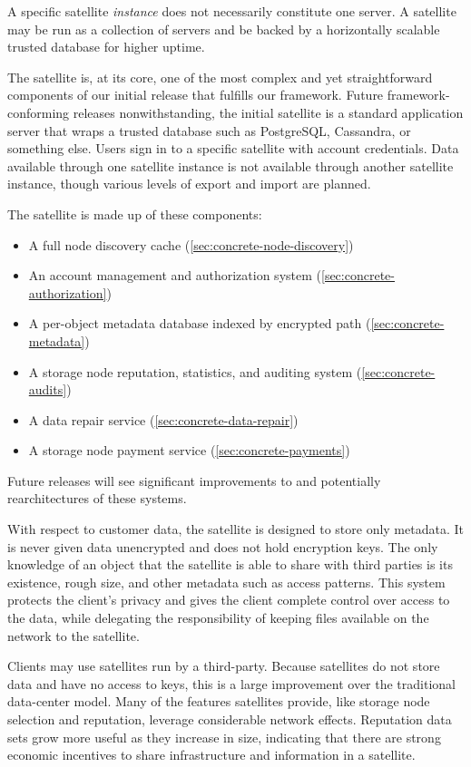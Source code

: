 \documentclass[11pt,fleqn,openany]{book}
\begin{document}
A specific satellite {\em instance} does not necessarily constitute one
server. A satellite may be run as a collection of servers and be backed by
a horizontally scalable trusted database for higher uptime.

The satellite is, at its core, one of the most complex and yet
straightforward components of our initial release that fulfills our framework.
Future framework-conforming releases nonwithstanding, the initial satellite
is a standard application server that wraps a trusted database such as
PostgreSQL, Cassandra, or something else. Users sign in to a specific
satellite with account credentials.
Data available through one satellite instance is
not available through another satellite instance, though various levels of
export and import are planned.

The satellite is made up of these components:

\begin{itemize}
\item A full node discovery cache (\ref{sec:concrete-node-discovery})
\item An account management and authorization system
  (\ref{sec:concrete-authorization})
\item A per-object metadata database indexed by encrypted path
  (\ref{sec:concrete-metadata})
\item A storage node reputation, statistics, and auditing system
  (\ref{sec:concrete-audits})
\item A data repair service (\ref{sec:concrete-data-repair})
\item A storage node payment service (\ref{sec:concrete-payments})
\end{itemize}

Future releases will see significant improvements to and potentially
rearchitectures of these systems.

With respect to customer data, the satellite is designed to store only
metadata. It is never given data unencrypted and does not hold encryption keys.
The only knowledge of an object that the satellite is able to share with
third parties is its existence, rough size, and other metadata such as access
patterns.
This system protects the client's privacy and gives the client complete
control over access to the data,
while delegating the responsibility of keeping files available on the network
to the satellite.

Clients may use satellites run by a third-party. Because satellites do not store
data and have no access to keys, this is a large improvement over the
traditional data-center model. Many of the features satellites provide, like
storage node selection and reputation, leverage considerable network effects.
Reputation data sets grow more useful as they increase in size,
indicating that there are strong economic incentives to share infrastructure
and information in a satellite.
\end{document}
